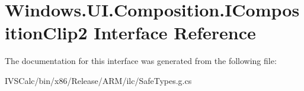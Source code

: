 \hypertarget{interface_windows_1_1_u_i_1_1_composition_1_1_i_composition_clip2}{}\section{Windows.\+U\+I.\+Composition.\+I\+Composition\+Clip2 Interface Reference}
\label{interface_windows_1_1_u_i_1_1_composition_1_1_i_composition_clip2}


The documentation for this interface was generated from the following file\+:\begin{DoxyCompactItemize}
\item 
I\+V\+S\+Calc/bin/x86/\+Release/\+A\+R\+M/ilc/Safe\+Types.\+g.\+cs\end{DoxyCompactItemize}
